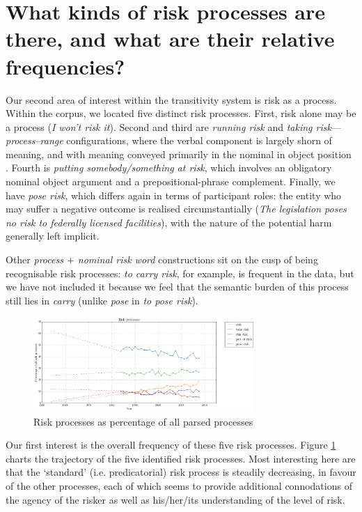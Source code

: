 \section{What kinds of risk processes are there, and what are their relative frequencies?} \FloatBarrier

    Our second area of interest within the transitivity system is risk as a process. Within the corpus, we located five distinct risk processes. First, risk alone may be a process (\emph{I won't risk it}). Second and third are \emph{running risk} and \emph{taking risk}---\emph{process--range} configurations, where the verbal component is largely shorn of meaning, and with meaning conveyed primarily in the nominal in object position \cite{halliday_introduction_2004}. Fourth is \emph{putting somebody/something at risk}, which involves an obligatory nominal object argument and a prepositional-phrase complement. Finally, we have \emph{pose risk}, which differs again in terms of participant roles: the entity who may suffer a negative outcome is realised circumstantially (\emph{The legislation poses no risk to federally licensed facilities}), with the nature of the potential harm generally left implicit.

    Other \emph{process $+$ nominal risk word} constructions sit on the cusp of being recognisable risk processes: \emph{to carry risk}, for example, is frequent in the data, but we have not included it because we feel that the semantic burden of this process still lies in \emph{carry} (unlike \emph{pose} in \emph{to pose risk}).
    \begin{figure}[htb!]
    \centering
    \includegraphics[width=0.75\textwidth]{../images/risk_processes.png}
    \caption{Risk processes as percentage of all parsed processes}
    \label{fig:riskprocesses}
    \end{figure}
    \noindent Our first interest is the overall frequency of these five risk processes. 
    Figure \ref{fig:riskprocesses} charts the trajectory of the five identified risk processes. Most interesting here are that the `standard' (i.e. predicatorial) risk process is steadily decreasing, in favour of the other processes, each of which seems to provide additional connodations of the agency of the risker as well as his\slash her\slash its understanding of the level of risk. 

